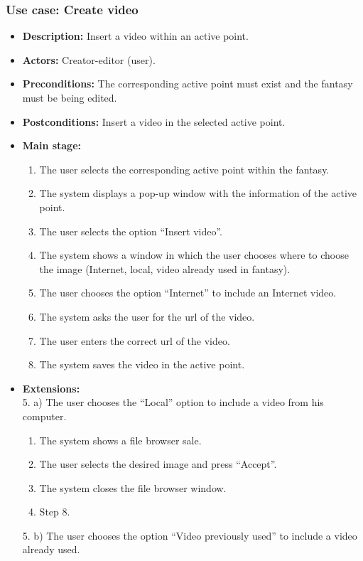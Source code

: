 \subsubsection{Use case: Create video}
\begin{itemize}
	\item \textbf{Description:} Insert a video within an active point.
	\item \textbf{Actors:} Creator-editor (user).
	\item \textbf{Preconditions:} The corresponding active point must exist and the fantasy must be being edited.
	\item \textbf{Postconditions:} Insert a video in the selected active point.
	\item \textbf{Main stage:}
	\begin{enumerate}
		\item The user selects the corresponding active point within the fantasy.
		\item The system displays a pop-up window with the information of the active point.
		\item The user selects the option ``Insert video''.
		\item The system shows a window in which the user chooses where to choose the image (Internet, local, video already used in fantasy).
		\item The user chooses the option ``Internet'' to include an Internet video.
		\item The system asks the user for the url of the video.
		\item The user enters the correct url of the video.
		\item The system saves the video in the active point.
	\end{enumerate}
	\item \textbf{Extensions:} \\ 5. a) The user chooses the ``Local'' option to include a video from his computer.
	\begin{enumerate}
		\item The system shows a file browser sale.
		\item The user selects the desired image and press ``Accept''.
		\item The system closes the file browser window.
		\item Step 8.
	\end{enumerate}
	5. b) The user chooses the option ``Video previously used'' to include a video already used.
	\begin{enumerate}

\end{enumerate}
\end{itemize}
